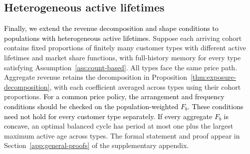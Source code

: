 \subsection{Heterogeneous active lifetimes}
\label{sec:heterogeneous-horizons}

\textcolor{black}{Finally, we extend the revenue decomposition and shape conditions to populations with heterogeneous active lifetimes.} Suppose each arriving cohort contains fixed proportions of finitely many customer types with different active lifetimes and market share functions, with full-history memory for every type satisfying Assumption~\ref{ass:count-based}. All types face the same price path. Aggregate revenue retains the decomposition in Proposition~\ref{thm:exposure-decomposition}, with each coefficient averaged across types using their cohort proportions. \textcolor{black}{For a common price policy, the arrangement and frequency conditions should be checked on the population-weighted \(F_b\). These conditions need not hold for every customer type separately. If every aggregate \(F_b\) is concave,} an optimal balanced cycle has period at most one plus the largest maximum active age across types. The formal statement and proof appear in Section~\ref{app:general-proofs} of the supplementary appendix.
